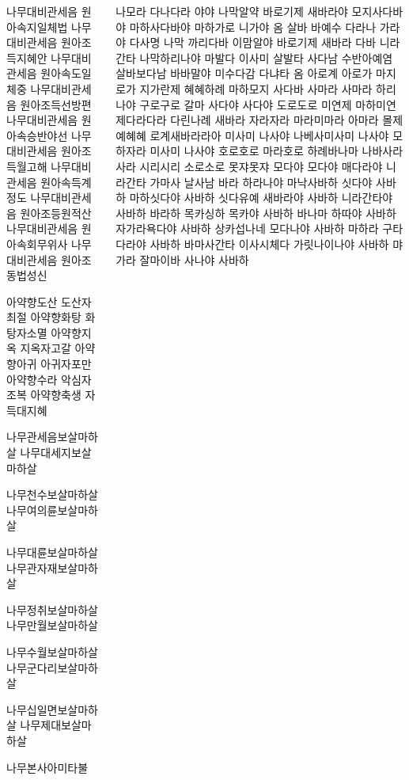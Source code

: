 \documentclass[20pt, a0paper ]{tikzposter}
\begin{document}
\begin{columns}
{\begin{LARGE}
나무대비관세음 원아속지일체법 나무대비관세음 원아조득지혜안
나무대비관세음 원아속도일체중 나무대비관세음 원아조득선방편
나무대비관세음 원아속승반야선 나무대비관세음 원아조득월고해
나무대비관세음 원아속득계정도 나무대비관세음 원아조등원적산
나무대비관세음 원아속회무위사 나무대비관세음 원아조동법성신

아약향도산 도산자최절 아약향화탕 화탕자소멸
아약향지옥 지옥자고갈 아약향아귀 아귀자포만
아약향수라 악심자조복 아약향축생 자득대지혜

나무관세음보살마하살 나무대세지보살마하살

나무천수보살마하살 나무여의륜보살마하살

나무대륜보살마하살 나무관자재보살마하살

나무정취보살마하살 나무만월보살마하살

나무수월보살마하살 나무군다리보살마하살

나무십일면보살마하살 나무제대보살마하살

나무본사아미타불
				\end{LARGE}
			}




			{
				\begin{LARGE}

나모라 다나다라 야야 나막알약 바로기제 새바라야 모지사다바야 마하사다바야 마하가로 니가야 옴 살바 바예수 다라나 가라야 다사명 나막 까리다바 이맘알야 바로기제 새바라 다바 니라간타 나막하리나야 마발다 이사미 살발타 사다남 수반아예염 살바보다남 바바말야 미수다감 다냐타 옴 아로계 아로가 마지로가 지가란제 혜혜하례 마하모지 사다바 사마라 사마라 하리나야 구로구로 갈마 사다야 사다야 도로도로 미연제 마하미연제다라다라 다린나례 새바라 자라자라 마라미마라 아마라 몰제예혜혜 로계새바라라아 미사미 나사야 나베사미사미 나사야 모하자라 미사미 나사야 호로호로 마라호로 하례바나마 나바사라사라 시리시리 소로소로 못쟈못쟈 모다야 모다야 매다라야 니라간타 가마사 날사남 바라 하라나야 마낙사바하 싯다야 사바하 마하싯다야 사바하 싯다유예 새바라야 사바하 니라간타야 사바하 바라하 목카싱하 목카야 사바하 바나마 하따야 사바하 자가라욕다야 사바하 상카섭나네 모다나야 사바하 마하라 구타다라야 사바하 바마사간타 이사시체다 가릿나이나야 사바하 먀가라 잘마이바 사나야 사바하


\end{LARGE}}
\end{columns}
\end{document}
